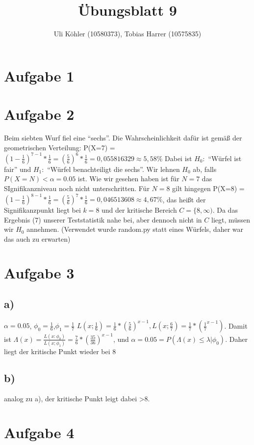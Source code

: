 \documentclass[a4paper,10pt,oneside,leqno]{scrartcl}
\title{Übungsblatt 9}
\author{Uli Köhler (10580373), Tobias Harrer (10575835)}
\begin{document}
\maketitle

\section*{Aufgabe 1}%


\section*{Aufgabe 2}%
Beim siebten Wurf fiel eine ``sechs''. Die Wahrscheinlichkeit dafür ist gemäß der geometrischen Verteilung:
P(X=7) = $(1-\frac{1}{6})^{7-1}*\frac{1}{6} = (\frac{5}{6})^{6}*\frac{1}{6} = 0,055816329 \approx 5,58\%$\newline
Dabei ist $H_0:$ ``Würfel ist fair'' und $H_1:$ ``Würfel benachteiligt die sechs''. Wir lehnen $H_0$ ab, falls
$P(X=N)<\alpha = 0.05$ ist. Wie wir gesehen haben ist für $N=7$ das SIgnifikanzniveau noch nicht unterschritten.
Für $N=8$ gilt hingegen P(X=8) = $(1-\frac{1}{6})^{8-1}*\frac{1}{6} = (\frac{5}{6})^{7}*\frac{1}{6} = 
0,046513608 \approx 4,67\%$, das heißt der Signifikanzpunkt liegt bei $k=8$ und der kritische Bereich $C = \{8,\infty)$.
Da das Ergebnis (7) unserer Teststatistik nahe bei, aber dennoch nicht in $C$ liegt, müssen wir $H_0$ annehmen.
(Verwendet wurde random.py statt eines Würfels, daher war das auch zu erwarten)

\section*{Aufgabe 3}%
\subsection*{a)}
$\alpha=0.05$, $\phi_0=\frac{1}{6}$,$\phi_1=\frac{1}{7}$\newline
$L(x;\frac{1}{6}) = \frac{1}{6}*(\frac{5}{6})^{x-1}, L(x;\frac{6}{7}) = \frac{1}{7}*(\frac{1}{7}^{x-1})$.\newline
Damit ist $\Lambda(x) = \frac{L(x:\phi_0)}{L(x;\phi_1)} = \frac{7}{6}*(\frac{35}{36})^{x-1}$, und $\alpha = 
0.05 = P(\Lambda(x)\leq \lambda | \phi_0)$. Daher liegt der kritische Punkt wieder bei 8

\subsection*{b)}
analog zu a), der kritische Punkt leigt dabei >8.

\section*{Aufgabe 4}%
\end{document}
